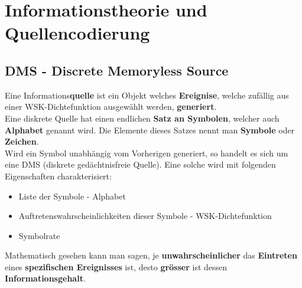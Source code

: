 \section{Informationstheorie und Quellencodierung }
\subsection{DMS - Discrete Memoryless Source}
Eine Informations\textbf{quelle} ist ein Objekt welches \textbf{Ereignise}, welche zufällig aus einer
WSK-Dichtefunktion ausgewählt werden, \textbf{generiert}. \\ 
Eine diskrete Quelle hat einen endlichen \textbf{Satz an Symbolen}, welcher auch \textbf{Alphabet}
genannt wird. Die Elemente dieses Satzes nennt man \textbf{Symbole} oder \textbf{Zeichen}. \\
Wird ein Symbol unabhängig vom Vorherigen generiert, so handelt es sich um eine DMS (diskrete
gedächtnisfreie Quelle). Eine solche wird mit folgenden Eigenschaften charakterisiert:
\begin{itemize}\addtolength{\itemsep}{-0.3\baselineskip}
  \item Liste der Symbole - Alphabet
  \item Auftretenswahrscheinlichkeiten dieser Symbole - WSK-Dichtefunktion
  \item Symbolrate 
\end{itemize} 

Mathematisch gesehen kann man sagen, je \textbf{unwahrscheinlicher} das \textbf{Eintreten} eines \textbf{spezifischen
Ereignisses} ist, desto \textbf{grösser} ist dessen \textbf{Informationsgehalt}. \\

